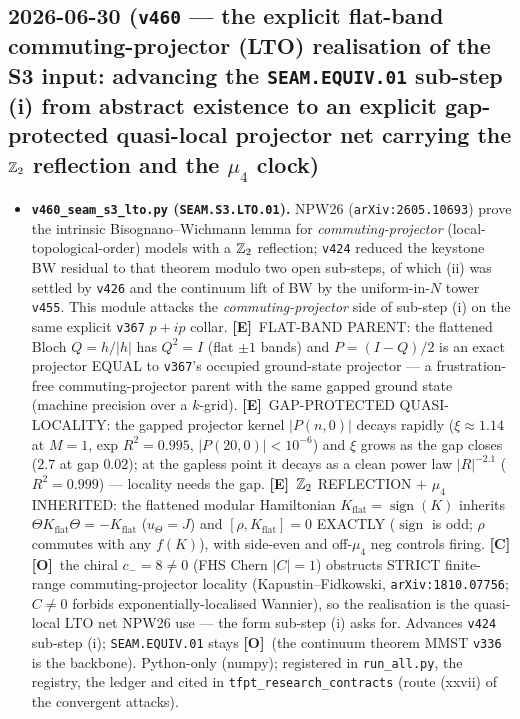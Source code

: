 \documentclass[11pt]{article}
\providecommand{\mE}{\textbf{[E]}}\providecommand{\mC}{\textbf{[C]}}
\providecommand{\mO}{\textbf{[O]}}\providecommand{\mX}{\textbf{[X]}}
\begin{document}
\subsection*{2026-06-30 (\texttt{v460} --- the explicit flat-band commuting-projector (LTO) realisation of the S3 input: advancing the \texttt{SEAM.EQUIV.01} sub-step (i) from abstract existence to an explicit gap-protected quasi-local projector net carrying the $\mathbb{Z}_2$ reflection and the $\mu_4$ clock)}
\begin{itemize}
\item \textbf{\texttt{v460\_seam\_s3\_lto.py} (\texttt{SEAM.S3.LTO.01}).} NPW26 (\texttt{arXiv:2605.10693}) prove the
intrinsic Bisognano--Wichmann lemma for \emph{commuting-projector} (local-topological-order) models with a $\mathbb{Z}_2$
reflection; \texttt{v424} reduced the keystone BW residual to that theorem modulo two open sub-steps, of which (ii)
was settled by \texttt{v426} and the continuum lift of BW by the uniform-in-$N$ tower \texttt{v455}. This module
attacks the \emph{commuting-projector} side of sub-step (i) on the same explicit \texttt{v367} $p{+}ip$ collar.
\mE\ FLAT-BAND PARENT: the flattened Bloch $Q{=}h/|h|$ has $Q^2{=}I$ (flat $\pm1$ bands) and $P{=}(I{-}Q)/2$ is an
exact projector EQUAL to \texttt{v367}'s occupied ground-state projector --- a frustration-free commuting-projector
parent with the same gapped ground state (machine precision over a $k$-grid). \mE\ GAP-PROTECTED QUASI-LOCALITY:
the gapped projector kernel $|P(n,0)|$ decays rapidly ($\xi{\approx}1.14$ at $M{=}1$, exp $R^2{=}0.995$,
$|P(20,0)|{<}10^{-6}$) and $\xi$ grows as the gap closes ($2.7$ at gap $0.02$); at the gapless point it decays as a
clean power law $|R|^{-2.1}$ ($R^2{=}0.999$) --- locality needs the gap. \mE\ $\mathbb{Z}_2$ REFLECTION $+$ $\mu_4$
INHERITED: the flattened modular Hamiltonian $K_{\mathrm{flat}}{=}\operatorname{sign}(K)$ inherits
$\Theta K_{\mathrm{flat}}\Theta{=}{-}K_{\mathrm{flat}}$ ($u_\Theta{=}J$) and $[\rho,K_{\mathrm{flat}}]{=}0$ EXACTLY
($\operatorname{sign}$ is odd; $\rho$ commutes with any $f(K)$), with side-even and off-$\mu_4$ neg controls firing.
\mC\mO\ the chiral $c_-{=}8{\neq}0$ (FHS Chern $|C|{=}1$) obstructs STRICT finite-range commuting-projector locality
(Kapustin--Fidkowski, \texttt{arXiv:1810.07756}; $C{\neq}0$ forbids exponentially-localised Wannier), so the
realisation is the quasi-local LTO net NPW26 use --- the form sub-step (i) asks for. Advances \texttt{v424} sub-step
(i); \texttt{SEAM.EQUIV.01} stays \mO\ (the continuum theorem MMST \texttt{v336} is the backbone). Python-only
(numpy); registered in \texttt{run\_all.py}, the registry, the ledger and cited in
\texttt{tfpt\_research\_contracts} (route (xxvii) of the convergent attacks).
\end{itemize}
\end{document}
